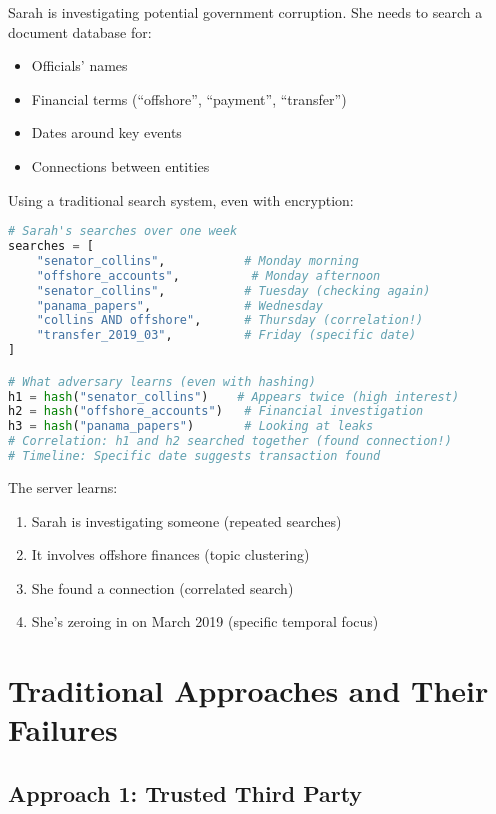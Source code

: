 \begin{example}
Sarah is investigating potential government corruption. She needs to search a document database for:
\begin{itemize}
\item Officials' names
\item Financial terms (``offshore'', ``payment'', ``transfer'')
\item Dates around key events
\item Connections between entities
\end{itemize}

Using a traditional search system, even with encryption:
\begin{lstlisting}[language=Python]
# Sarah's searches over one week
searches = [
    "senator_collins",           # Monday morning
    "offshore_accounts",          # Monday afternoon
    "senator_collins",           # Tuesday (checking again)
    "panama_papers",             # Wednesday
    "collins AND offshore",      # Thursday (correlation!)
    "transfer_2019_03",          # Friday (specific date)
]

# What adversary learns (even with hashing)
h1 = hash("senator_collins")    # Appears twice (high interest)
h2 = hash("offshore_accounts")   # Financial investigation
h3 = hash("panama_papers")       # Looking at leaks
# Correlation: h1 and h2 searched together (found connection!)
# Timeline: Specific date suggests transaction found
\end{lstlisting}

The server learns:
\begin{enumerate}
\item Sarah is investigating someone (repeated searches)
\item It involves offshore finances (topic clustering)
\item She found a connection (correlated search)
\item She's zeroing in on March 2019 (specific temporal focus)
\end{enumerate}
\end{example}

\section{Traditional Approaches and Their Failures}

\subsection{Approach 1: Trusted Third Party}


